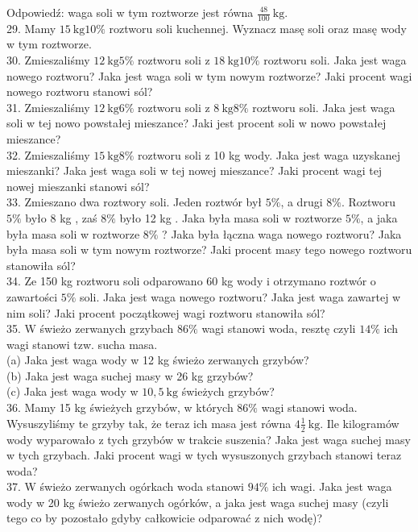 \documentclass[10pt]{article}
\begin{document}
Odpowiedź: waga soli w tym roztworze jest równa \(\frac{48}{100} \mathrm{~kg}\).\\
29. Mamy \(15 \mathrm{~kg} 10 \%\) roztworu soli kuchennej. Wyznacz masę soli oraz masę wody w tym roztworze.\\
30. Zmieszaliśmy \(12 \mathrm{~kg} 5 \%\) roztworu soli z \(18 \mathrm{~kg} 10 \%\) roztworu soli. Jaka jest waga nowego roztworu? Jaka jest waga soli w tym nowym roztworze? Jaki procent wagi nowego roztworu stanowi sól?\\
31. Zmieszaliśmy \(12 \mathrm{~kg} 6 \%\) roztworu soli z \(8 \mathrm{~kg} 8 \%\) roztworu soli. Jaka jest waga soli w tej nowo powstałej mieszance? Jaki jest procent soli w nowo powstałej mieszance?\\
32. Zmieszaliśmy \(15 \mathrm{~kg} 8 \%\) roztworu soli z 10 kg wody. Jaka jest waga uzyskanej mieszanki? Jaka jest waga soli w tej nowej mieszance? Jaki procent wagi tej nowej mieszanki stanowi sól?\\
33. Zmieszano dwa roztwory soli. Jeden roztwór był \(5 \%\), a drugi \(8 \%\). Roztworu \(5 \%\) było 8 kg , zaś \(8 \%\) było 12 kg . Jaka była masa soli w roztworze \(5 \%\), a jaka była masa soli w roztworze \(8 \%\) ? Jaka była łączna waga nowego roztworu? Jaka była masa soli w tym nowym roztworze? Jaki procent masy tego nowego roztworu stanowiła sól?\\
34. Ze 150 kg roztworu soli odparowano 60 kg wody i otrzymano roztwór o zawartości \(5 \%\) soli. Jaka jest waga nowego roztworu? Jaka jest waga zawartej w nim soli? Jaki procent początkowej wagi roztworu stanowiła sól?\\
35. W świeżo zerwanych grzybach \(86 \%\) wagi stanowi woda, resztę czyli \(14 \%\) ich wagi stanowi tzw. sucha masa.\\
(a) Jaka jest waga wody w 12 kg świeżo zerwanych grzybów?\\
(b) Jaka jest waga suchej masy w 26 kg grzybów?\\
(c) Jaka jest waga wody w \(10,5 \mathrm{~kg}\) świeżych grzybów?\\
36. Mamy 15 kg świeżych grzybów, w których \(86 \%\) wagi stanowi woda. Wysuszyliśmy te grzyby tak, że teraz ich masa jest równa \(4 \frac{1}{2} \mathrm{~kg}\). Ile kilogramów wody wyparowało z tych grzybów w trakcie suszenia? Jaka jest waga suchej masy w tych grzybach. Jaki procent wagi w tych wysuszonych grzybach stanowi teraz woda?\\
37. W świeżo zerwanych ogórkach woda stanowi \(94 \%\) ich wagi. Jaka jest waga wody w 20 kg świeżo zerwanych ogórków, a jaka jest waga suchej masy (czyli tego co by pozostało gdyby całkowicie odparować z nich wodę)?\\
\end{document}

